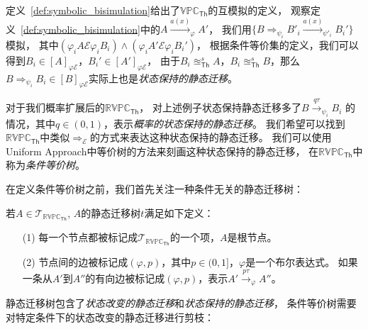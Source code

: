    定义~\ref{def:symbolic_bisimulation}给出了$\mathbb{VPC}_{\mathsf{Th}}$的互模拟的定义，
   观察定义~\ref{def:symbolic_bisimulation}中的$A\stackrel{a(x)}{\longrightarrow}_{\varphi} A'$，
   我们用$\{B\Rightarrow_{\psi_i}B'_i\stackrel{a(x)}{\longrightarrow}_{\psi'_i}B_i'\}$模拟，
   其中$(\varphi_i A\mathcal{E}\varphi_i B_i)\wedge(\varphi_i A'\mathcal{E}\varphi_i B_i')$，
   根据条件等价集的定义，我们可以得到$B_i\in [A]_{\varphi\mathcal{E}}$，$B_i'\in [A']_{\varphi \mathcal{E}}$，
   由于$B_i \approxeq_{\mathsf{Th}}^s A$，$B_i\approxeq_{\mathsf{Th}}^s B$，那么$B\Rightarrow_{\psi_i}B_i\in[B]_{\varphi\mathcal{E}}$实际上也是\textit{状态保持的静态迁移}。

   对于我们概率扩展后的$\mathbb{RVPC}_{\mathsf{Th}}$，
   对上述例子状态保持静态迁移多了$B\stackrel{q\tau}{\rightarrow}_{\psi_i} B_i$
   的情况，其中$q\in(0,1)$，表示\textit{概率的状态保持的静态迁移}。
   我们希望可以找到$\mathbb{RVPC}_{\mathsf{Th}}$中类似$\Rightarrow_{\mathcal{E}}$的方式来表达这种状态保持的静态迁移。
   我们可以使用Uniform Approach中等价树的方法来刻画这种状态保持的静态迁移，
   在$\mathbb{RVPC}_{\mathsf{Th}}$中称为\textit{条件等价树}。

   在定义条件等价树之前，我们首先关注一种条件无关的静态迁移树：
\begin{definition}[静态迁移树]
   \label{def:silent_tree}
   若$A\in \mathcal{T}_{\mathbb{RVPC}_{\mathsf{Th}}}$,
   $A$的静态迁移树$t$满足如下定义：
   \begin{itemize}
   \item[(1)] 每一个节点都被标记成$\mathcal{T}_{\mathbb{RVPC}_{\mathsf{Th}}}$的一个项，$A$是根节点。
   \item[(2)] {
      节点间的边被标记成$(\varphi,p)$，其中$p\in(0,1]$，$\varphi$是一个布尔表达式。
      如果一条从$A'$到$A''$的有向边被标记成$(\varphi,p)$，表示$A'\stackrel{p\tau}{\rightarrow}_{\varphi} A''$。
   }
   \end{itemize}
\end{definition}

静态迁移树包含了\textit{状态改变的静态迁移}和\textit{状态保持的静态迁移}，
条件等价树需要对特定条件下的状态改变的静态迁移进行剪枝：

